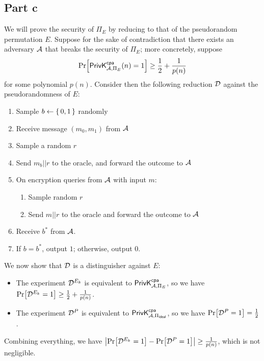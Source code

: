 \documentclass{article}
\theoremstyle{definition}
\begin{document}
\subsection*{Part c}

We will prove the security of $\Pi_E$ by reducing to that of the pseudorandom permutation $E$.
Suppose for the sake of contradiction that there exists an adversary $\mathcal{A}$ that breaks the security of $\Pi_E$;
more concretely, suppose
$$\Pr[\mathsf{PrivK}^{\mathsf{cpa}}_{\mathcal{A}, \Pi_E}(n)=1]\geq \frac{1}{2}+\frac{1}{p(n)}$$
for some polynomial $p(n)$.
Consider then the following reduction $\mathcal{D}$ against the pseudorandomness of $E$: \begin{enumerate}
    \item Sample $b\gets\set{0, 1}$ randomly
    \item Receive message $(m_0, m_1)$ from $\mathcal{A}$
    \item Sample a random $r$
    \item Send $m_b||r$ to the oracle, and forward the outcome to $\mathcal{A}$
    \item On encryption queries from $\mathcal{A}$ with input $m$:
    \begin{enumerate}
        \item Sample random $r$
        \item Send $m||r$ to the oracle and forward the outcome to $\mathcal{A}$
    \end{enumerate}
    \item Receive $b^*$ from $\mathcal{A}$.
    \item If $b=b^*$, output $1$; otherwise, output $0$.
\end{enumerate}
We now show that $\mathcal{D}$ is a distinguisher against $E$:
\begin{itemize}
    \item The experiment $\mathcal{D}^{E_k}$ is equivalent to
    $\mathsf{PrivK}^{\mathsf{cpa}}_{\mathcal{A}, \Pi_E}$, so we have $\Pr[\mathcal{D}^{E_k}=1]\geq\frac{1}{2}+\frac{1}{p(n)}$.
    \item The experiment $\mathcal{D}^{P}$ is equivalent to  $\mathsf{PrivK}^{\mathsf{cpa}}_{\mathcal{A}, \Pi_{\mathsf{ideal}}}$, so we have
    $\Pr[\mathcal{D}^{P}=1]=\frac{1}{2}$.
\end{itemize}
Combining everything, we have
$\abs{\Pr[\mathcal{D}^{E_k}=1]-\Pr[\mathcal{D}^{P}=1]} \geq \frac{1}{p(n)}$,
which is not negligible.
\end{document}
